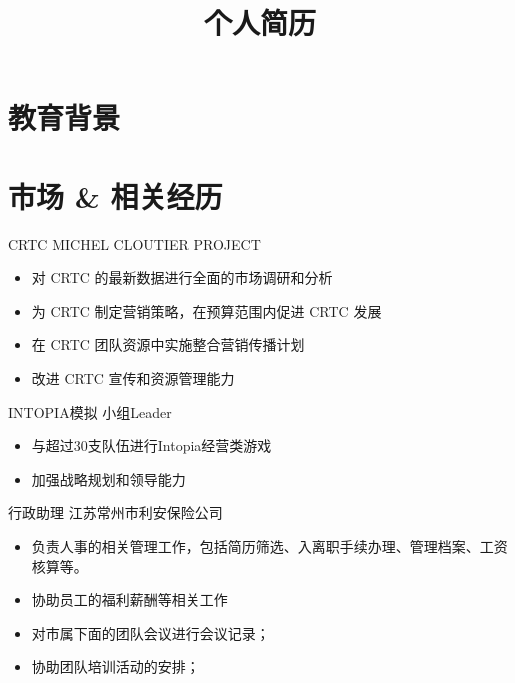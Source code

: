 \documentclass[11pt,a4paper]{moderncv}
\title{个人简历}                      %
\begin{document}
\maketitle

\section{教育背景}


\section{市场 \& 相关经历}
\renewcommand{\baselinestretch}{1.2}
{CRTC MICHEL CLOUTIER PROJECT}
{}
{}{}
{
\begin{itemize}
\item 对 CRTC 的最新数据进行全面的市场调研和分析
\item 为 CRTC 制定营销策略，在预算范围内促进 CRTC 发展
\item 在 CRTC 团队资源中实施整合营销传播计划
\item 改进 CRTC 宣传和资源管理能力
\end{itemize}
}

{INTOPIA模拟}
{}
{}{小组Leader}
{
\begin{itemize}
\item 与超过30支队伍进行Intopia经营类游戏
\item 加强战略规划和领导能力
\end{itemize}
}

{行政助理}
{江苏常州市利安保险公司}
{}{}
{
\begin{itemize}
\item 负责人事的相关管理工作，包括简历筛选、入离职手续办理、管理档案、工资核算等。
\item 协助员工的福利薪酬等相关工作 
\item 对市属下面的团队会议进行会议记录； 
\item 协助团队培训活动的安排；  
\end{itemize}
}
\end{document}
